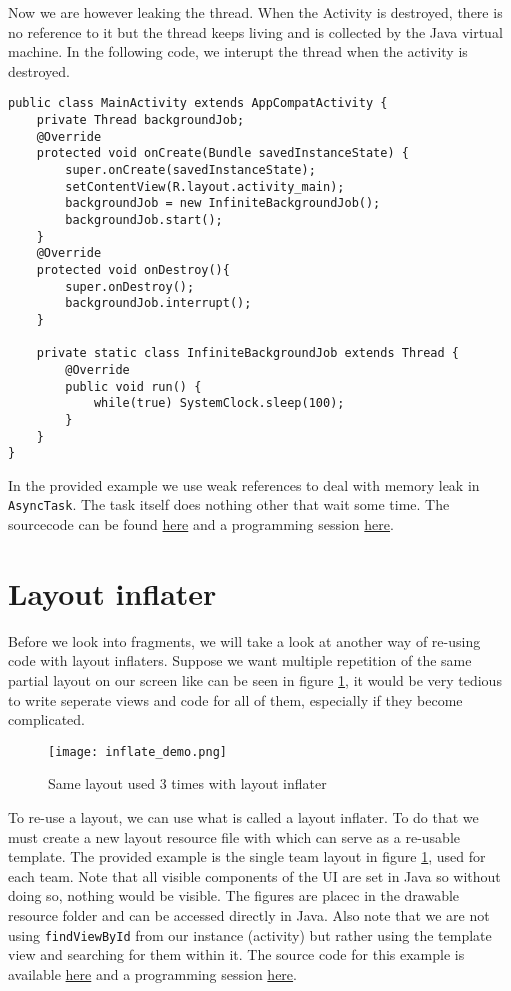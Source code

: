 Now we are however leaking the thread. When the Activity is destroyed, there is no reference to it but the thread keeps living and is collected by the Java virtual machine. In the following code, we interupt the thread when the activity is destroyed.
\begin{lstlisting}[style=A_Java]
public class MainActivity extends AppCompatActivity {
    private Thread backgroundJob;
    @Override
    protected void onCreate(Bundle savedInstanceState) {
        super.onCreate(savedInstanceState);
        setContentView(R.layout.activity_main);
        backgroundJob = new InfiniteBackgroundJob();
        backgroundJob.start();
    }
    @Override
    protected void onDestroy(){
        super.onDestroy();
        backgroundJob.interrupt();
    }

    private static class InfiniteBackgroundJob extends Thread {
        @Override
        public void run() {
            while(true) SystemClock.sleep(100);
        }
    }
}
\end{lstlisting}
In the provided example we use weak references to deal with memory leak in \texttt{AsyncTask}. The task itself does nothing other that wait some time. The sourcecode can be found \href{...}{here} and a programming session \href{TODO}{here}.

\section{Layout inflater}
Before we look into fragments, we will take a look at another way of re-using code with layout inflaters. Suppose we want multiple repetition of the same partial layout on our screen like can be seen in figure \ref{fig:infldem}, it would be very tedious to write seperate views and code for all of them, especially if they become complicated.

\begin{figure}[H]
\centering
\texttt{[image: inflate\_demo.png]}
\caption{Same layout used 3 times with layout inflater}
\label{fig:infldem}
\end{figure}

To re-use a layout, we can use what is called a layout inflater. To do that we must create a new layout resource file with  which can serve as a re-usable template. The provided example is the single team layout in figure \ref{fig:infldem}, used for each team. Note that all visible components of the UI are set in Java so without doing so, nothing would be visible. The figures are placec in the drawable resource folder and can be accessed directly in Java. Also note that we are not using \texttt{findViewById} from our instance (activity) but rather using the template view and searching for them within it. The source code for this example is available \href{https://github.com/JonSteinn/AndroidDevelopment/tree/master/examples/lab3/inflator}{here} and a programming session \href{TODO}{here}.

